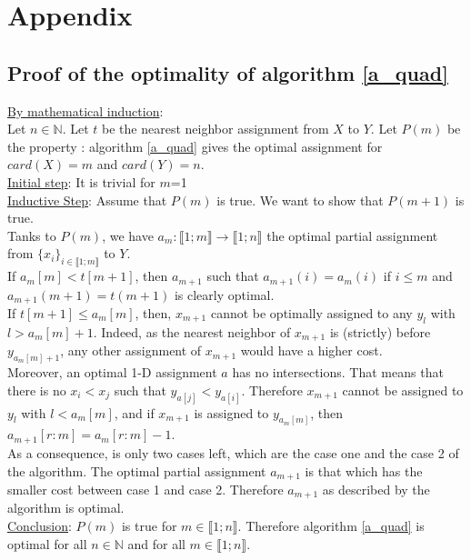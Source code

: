 \documentclass[a4paper,12pt]{article}
\begin{document}
\section{Appendix}

\subsection{Proof of the optimality of algorithm \ref{a_quad}}
\label{a_quad_proof}

\noindent \underline{By mathematical induction}:\\
Let $n \in \mathbb{N}$.
Let $t$ be the nearest neighbor assignment from $X$ to $Y$.
Let $P(m)$ be the property : algorithm \ref{a_quad} gives the optimal assignment for $card(X)=m$ and $card(Y)=n$.\\
\noindent \underline{Initial step}: It is trivial for $m$=1 \\
\noindent \underline{Inductive Step}: Assume that $P(m)$ is true. We want to show that $P(m+1)$ is true. \\
\noindent Tanks to $P(m)$, we have $a_m : \llbracket 1;m \rrbracket \rightarrow \llbracket 1;n \rrbracket$ the optimal partial assignment from $\{x_i\}_{i \in \llbracket 1;m \rrbracket}$ to $Y$.\\
\noindent If $a_m[m] < t[m+1]$, then $a_{m+1}$ such that $a_{m+1}(i)=a_m(i)$ if $i \leqslant m$ and $a_{m+1}(m+1)=t(m+1)$ is clearly optimal.\\
\noindent
\noindent If $t[m+1] \leqslant a_m[m]$, then, $x_{m+1}$ cannot be optimally assigned to any $y_l$ with $l>a_m[m]+1$. Indeed, as the nearest neighbor of $x_{m+1}$ is (strictly) before $y_{a_m[m]+1}$, any other assignment of $x_{m+1}$ would have a higher cost. \\
\noindent Moreover, an optimal 1-D assignment $a$ has no intersections. That means that there is no $x_i < x_j$ such that $y_{a[j]} < y_{a[i]}$. Therefore $x_{m+1}$  cannot be assigned to $y_l$ with $l<a_m[m]$, and if $x_{m+1}$ is assigned to $y_{a_m[m]}$, then $a_{m+1}[r:m] = a_{m}[r:m]-1$.\\
\noindent As a consequence, is only two cases left, which are the case one and the case 2 of the algorithm. The optimal partial assignment $a_{m+1}$ is that which has the smaller cost between case 1 and case 2.
\noindent Therefore $a_{m+1}$ as described by the algorithm is optimal.\\
\noindent \underline{Conclusion}: $P(m)$ is true for $m \in \llbracket 1;n \rrbracket$. Therefore algorithm \ref{a_quad} is optimal for all $n \in \mathbb{N}$ and for all $m \in \llbracket 1;n \rrbracket$.
\end{document}
